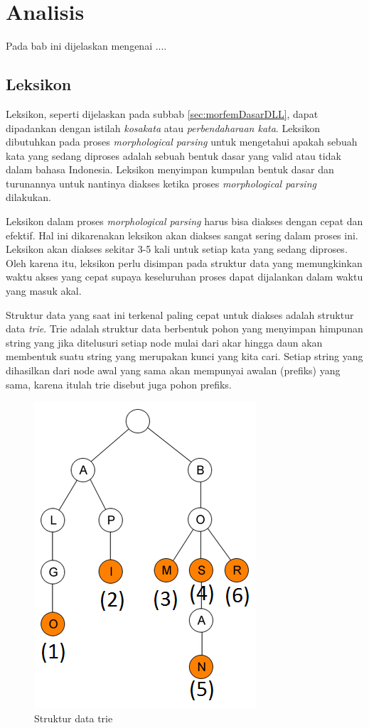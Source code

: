 \chapter{Analisis}
\label{chap:analisis}

Pada bab ini dijelaskan mengenai ....

\section{Leksikon}
\label{sec:leksikon}
Leksikon, seperti dijelaskan pada subbab \ref{sec:morfemDasarDLL}, dapat dipadankan dengan istilah \textit{kosakata} atau \textit{perbendaharaan kata}. Leksikon dibutuhkan pada proses \textit{morphological parsing} untuk mengetahui apakah sebuah kata yang sedang diproses adalah sebuah bentuk dasar yang valid atau tidak dalam bahasa Indonesia. Leksikon menyimpan kumpulan bentuk dasar dan turunannya untuk nantinya diakses ketika proses \textit{morphological parsing} dilakukan.

Leksikon dalam proses \textit{morphological parsing} harus bisa diakses dengan cepat dan efektif. Hal ini dikarenakan leksikon akan diakses sangat sering dalam proses ini. Leksikon akan diakses sekitar 3-5 kali untuk setiap kata yang sedang diproses. Oleh karena itu, leksikon perlu disimpan pada struktur data yang memungkinkan waktu akses yang cepat supaya keseluruhan proses dapat dijalankan dalam waktu yang masuk akal. 

Struktur data yang saat ini terkenal paling cepat untuk diakses adalah struktur data \textit{trie}. Trie adalah struktur data berbentuk pohon yang menyimpan himpunan string yang jika ditelusuri setiap node mulai dari akar hingga daun akan membentuk suatu string yang merupakan kunci yang kita cari. Setiap string yang dihasilkan dari node awal yang sama akan mempunyai awalan (prefiks) yang sama, karena itulah trie disebut juga pohon prefiks.

\begin{figure}[H]
\centering
\includegraphics[scale=0.75]{Gambar/gambar-trie}
\caption[Struktur data trie]{Struktur data trie} 
\label{bagan-trie}
\end{figure}

